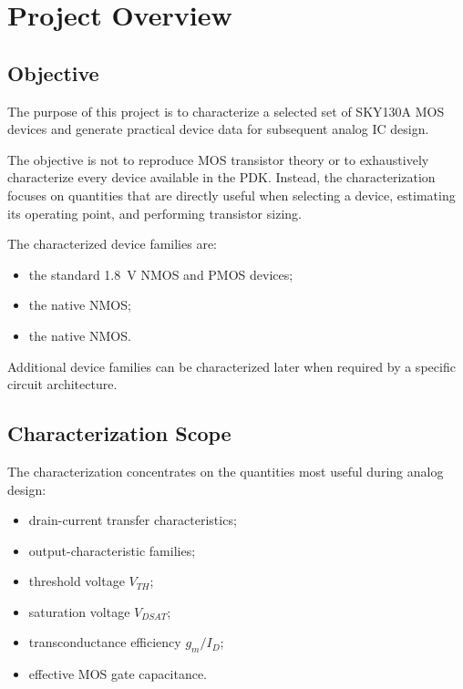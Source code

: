 
\section{Project Overview}
\label{sec:project_overview}



\subsection{Objective}

The purpose of this project is to characterize a selected set of
SKY130A MOS devices and generate practical device data for subsequent
analog IC design.

The objective is not to reproduce MOS transistor theory or to
exhaustively characterize every device available in the PDK.
Instead, the characterization focuses on quantities that are directly
useful when selecting a device, estimating its operating point, and
performing transistor sizing.

The characterized device families are:

\begin{itemize}
	\item the standard \qty{1.8}{\volt} NMOS and PMOS devices;
	\item the  native NMOS;
	\item the  native NMOS.
\end{itemize}

Additional device families can be characterized later when required by
a specific circuit architecture.



\subsection{Characterization Scope}

The characterization concentrates on the quantities most useful during
analog design:

\begin{itemize}
	\item drain-current transfer characteristics;
	\item output-characteristic families;
	\item threshold voltage $V_{TH}$;
	\item saturation voltage $V_{DSAT}$;
	\item transconductance efficiency $g_m/I_D$;
	\item effective MOS gate capacitance.
\end{itemize}

